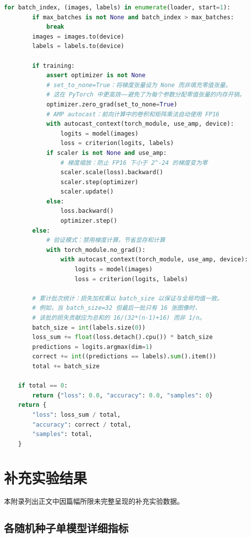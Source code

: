 \documentclass[12pt,a4paper,UTF8,openany]{ctexbook}
\begin{document}
\begin{lstlisting}[language=Python, caption={训练主流程核心函数（train.py 摘录）}, label={lst:train}]
    for batch_index, (images, labels) in enumerate(loader, start=1):
        if max_batches is not None and batch_index > max_batches:
            break
        images = images.to(device)
        labels = labels.to(device)

        if training:
            assert optimizer is not None
            # set_to_none=True：将梯度张量设为 None 而非填充零值张量。
            # 这在 PyTorch 中更高效——避免了为每个参数分配零值张量的内存开销。
            optimizer.zero_grad(set_to_none=True)
            # AMP autocast：前向计算中的卷积和矩阵乘法自动使用 FP16
            with autocast_context(torch_module, use_amp, device):
                logits = model(images)
                loss = criterion(logits, labels)
            if scaler is not None and use_amp:
                # 梯度缩放：防止 FP16 下小于 2^-24 的梯度变为零
                scaler.scale(loss).backward()
                scaler.step(optimizer)
                scaler.update()
            else:
                loss.backward()
                optimizer.step()
        else:
            # 验证模式：禁用梯度计算，节省显存和计算
            with torch_module.no_grad():
                with autocast_context(torch_module, use_amp, device):
                    logits = model(images)
                    loss = criterion(logits, labels)

        # 累计批次统计：损失加权乘以 batch_size 以保证与全局均值一致。
        # 例如，当 batch_size=32 但最后一批只有 16 张图像时，
        # 该批的损失贡献应为总和的 16/(32*(n-1)+16) 而非 1/n。
        batch_size = int(labels.size(0))
        loss_sum += float(loss.detach().cpu()) * batch_size
        predictions = logits.argmax(dim=1)
        correct += int((predictions == labels).sum().item())
        total += batch_size

    if total == 0:
        return {"loss": 0.0, "accuracy": 0.0, "samples": 0}
    return {
        "loss": loss_sum / total,
        "accuracy": correct / total,
        "samples": total,
    }
\end{lstlisting}

\chapter{补充实验结果}

本附录列出正文中因篇幅所限未完整呈现的补充实验数据。

\section{各随机种子单模型详细指标}
\end{document}
